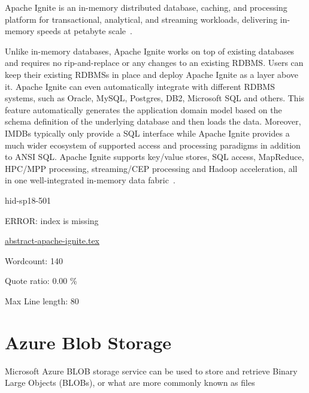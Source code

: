 Apache Ignite is an in-memory distributed database, caching, and processing
platform for transactional, analytical, and streaming workloads, delivering
in-memory speeds at petabyte scale~\cite{hid-sp18-501-ApacheIgnite}.

Unlike in-memory databases, Apache Ignite works on top of existing databases and
requires no rip-and-replace or any changes to an existing RDBMS. Users can keep
their existing RDBMSs in place and deploy Apache Ignite as a layer above it.
Apache Ignite can even automatically integrate with different RDBMS systems,
such as Oracle, MySQL, Postgres, DB2, Microsoft SQL and others. This feature
automatically generates the application domain model based on the schema
definition of the underlying database and then loads the data. Moreover, IMDBs
typically only provide a SQL interface while Apache Ignite provides a much wider
ecosystem of supported access and processing paradigms in addition to ANSI SQL.
Apache Ignite supports key/value stores, SQL access, MapReduce, HPC/MPP
processing, streaming/CEP processing and Hadoop acceleration, all in one
well-integrated in-memory data fabric~\cite{hid-sp18-501-GridGain}.


\begin{IU}

hid-sp18-501

ERROR: index is missing

\href{https://github.com/cloudmesh-community/hid-sp18-501/blob/master//technology/abstract-apache-ignite.tex}{abstract-apache-ignite.tex}

 

Wordcount: 140


Quote ratio: 0.00 \%
 
Max Line length: 80
\end{IU}

\section{Azure Blob Storage}

Microsoft Azure BLOB storage service can be used to store and retrieve Binary
Large Objects (BLOBs), or what are more commonly known as files~\cite{hid-sp18-501-RedGate}


